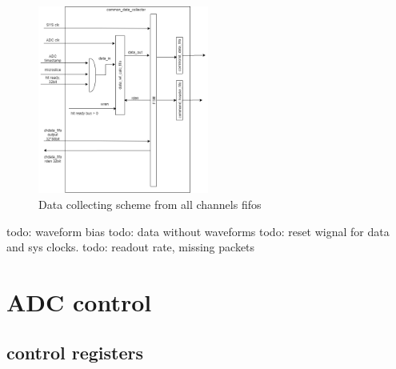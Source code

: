\documentclass{article}
\begin{document}
\begin{figure}[H]
	\centering 
	\includegraphics[width=0.5\textwidth]{ADC_common_event_collection.png}
	\caption{\label{fig:3} Data collecting scheme from all channels fifos}
\end{figure}

todo: waveform bias
todo: data without waveforms
todo: reset wignal for data and sys clocks.
todo: readout rate, missing packets

\section{ADC control}
\subsection{control registers}
\end{document}
